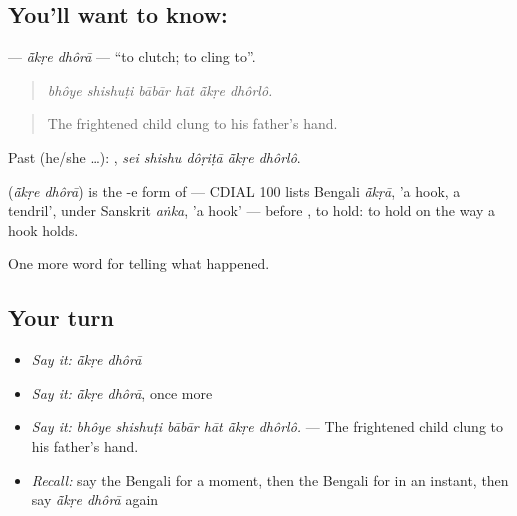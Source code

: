 \subsection*{You'll want to know:  }
\textbf{ } — \emph{ā̃kṛe dhôrā} — \textquotedblleft{}to clutch; to cling to\textquotedblright{}.

\begin{quote}
     
\end{quote}

\begin{quote}
\emph{bhôye shishuṭi bābār hāt ā̃kṛe dhôrlô.}
\end{quote}

\begin{quote}
The frightened child clung to his father's hand.
\end{quote}

Past (he/she …):     , \emph{sei shishu dôṛiṭā ā̃kṛe dhôrlô}.

\begin{cousinweb}
\textbf{ } (\emph{ā̃kṛe dhôrā}) is the -e form of  — CDIAL 100 lists Bengali \emph{ã̄kṛā}, 'a hook, a tendril', under Sanskrit \emph{aṅka}, 'a hook' — before \textbf{}, to hold: to hold on the way a hook holds.
\end{cousinweb}

\begin{grammarlens}[title={What you've built}]
One more word for telling what happened.
\end{grammarlens}

\subsection*{Your turn}
\begin{itemize}
\raggedright
  \item \emph{Say it:} \emph{ā̃kṛe dhôrā}
  \item \emph{Say it:} \emph{ā̃kṛe dhôrā}, once more
  \item \emph{Say it:} \emph{bhôye shishuṭi bābār hāt ā̃kṛe dhôrlô.} — The frightened child clung to his father's hand.
  \item \emph{Recall:} say the Bengali for a moment, then the Bengali for in an instant, then say \emph{ā̃kṛe dhôrā} again
\end{itemize}

